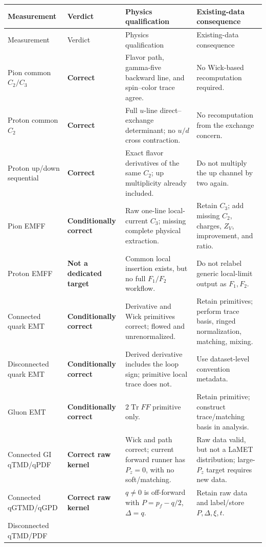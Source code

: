 \documentclass[11pt,a4paper]{article}
\numberwithin{equation}{section}
\newcommand{\Tr}{\operatorname{Tr}}
\newcommand{\good}[1]{\textcolor{auditgreen}{\textbf{#1}}}
\newcommand{\warn}[1]{\textcolor{auditamber}{\textbf{#1}}}
\begin{document}
\begin{longtable}{@{}L{0.17\textwidth}L{0.19\textwidth}L{0.34\textwidth}L{0.22\textwidth}@{}}
\toprule
Measurement & Verdict & Physics qualification & Existing-data consequence\\
\midrule
\endfirsthead
\toprule
Measurement & Verdict & Physics qualification & Existing-data consequence\\
\midrule
\endhead
Pion common \(C_2/C_3\) &
\good{Correct} &
Flavor path, gamma-five backward line, and spin--color trace agree. &
No Wick-based recomputation required.\\
Proton common \(C_2\) &
\good{Correct} &
Full \(u\)-line direct--exchange determinant; no \(u/d\) cross contraction. &
No recomputation from the exchange concern.\\
Proton up/down sequential &
\good{Correct} &
Exact flavor derivatives of the same \(C_2\); up multiplicity already included. &
Do not multiply the up channel by two again.\\
Pion EMFF &
\warn{Conditionally correct} &
Raw one-line local-current \(C_3\); missing complete physical extraction. &
Retain \(C_3\); add missing \(C_2\), charges, \(Z_V\), improvement, and ratio.\\
Proton EMFF &
\warn{Not a dedicated target} &
Common local insertion exists, but no full \(F_1/F_2\) workflow. &
Do not relabel generic local-limit output as \(F_1,F_2\).\\
Connected quark EMT &
\warn{Conditionally correct} &
Derivative and Wick primitives correct; flowed and unrenormalized. &
Retain primitives; perform trace basis, ringed normalization, matching, mixing.\\
Disconnected quark EMT &
\warn{Conditionally correct} &
Derived derivative includes the loop sign; primitive local trace does not. &
Use dataset-level convention metadata.\\
Gluon EMT &
\warn{Conditionally correct} &
\(2\Tr FF\) primitive only. &
Retain primitive; construct trace/matching basis in analysis.\\
Connected GI qTMD/qPDF &
\warn{Correct raw kernel} &
Wick and path correct; current forward runner has \(P_z=0\), with no soft/matching. &
Raw data valid, but not a LaMET distribution; large-\(P_z\) target requires new data.\\
Connected qGTMD/qGPD &
\warn{Correct raw kernel} &
\(q\ne0\) is off-forward with
\(P=p_f-q/2\), \(\Delta=q\). &
Retain raw data and label/store \(P,\Delta,\xi,t\).\\
Disconnected qTMD/PDF &

\end{longtable}
\end{document}

